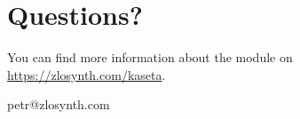 \documentclass[11pt]{article}
\begin{document}
\begin{minipage}{0.05\textwidth}
\phantom{ }
\end{minipage}%
\begin{minipage}[t]{0.3\textwidth}
\setlength{\parskip}{6pt}
\section{Questions?}

You can find more information about the module on
\url{https://zlosynth.com/kaseta}.

\vspace{3mm}

\begin{center}
petr@zlosynth.com
\end{center}
\end{minipage}
\end{document}
